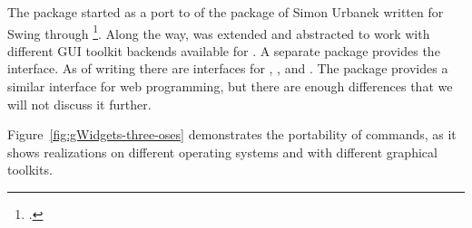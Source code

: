 
The  package started as a port to  of the
 package of Simon Urbanek written for Swing through
\footcite{iWidgets}. Along the way,  was
extended and abstracted to work with different GUI toolkit backends
available for \R. A separate package provides the interface. As of
writing there are interfaces for , , and
. The  package provides a similar
interface for web programming, but there are enough differences that
we will not discuss it further.

Figure~\ref{fig:gWidgets-three-oses} demonstrates the portability of
 commands, as it shows realizations on different
operating systems and with different graphical toolkits.

